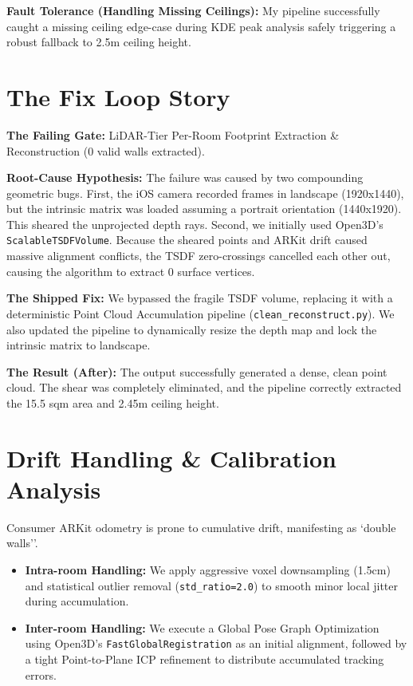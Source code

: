 \documentclass[11pt,a4paper]{article}
\begin{document}
\textbf{Fault Tolerance (Handling Missing Ceilings):} My pipeline successfully caught a missing ceiling edge-case during KDE peak analysis safely triggering a robust fallback to 2.5m ceiling height.

\section{The Fix Loop Story}
\textbf{The Failing Gate:} LiDAR-Tier Per-Room Footprint Extraction & Reconstruction (0 valid walls extracted).

\textbf{Root-Cause Hypothesis:} The failure was caused by two compounding geometric bugs. First, the iOS camera recorded frames in landscape (1920x1440), but the intrinsic matrix was loaded assuming a portrait orientation (1440x1920). This sheared the unprojected depth rays. Second, we initially used Open3D's \texttt{ScalableTSDFVolume}. Because the sheared points and ARKit drift caused massive alignment conflicts, the TSDF zero-crossings cancelled each other out, causing the algorithm to extract 0 surface vertices.

\textbf{The Shipped Fix:} We bypassed the fragile TSDF volume, replacing it with a deterministic Point Cloud Accumulation pipeline (\texttt{clean\_reconstruct.py}). We also updated the pipeline to dynamically resize the depth map and lock the intrinsic matrix to landscape.

\textbf{The Result (After):} The output successfully generated a dense, clean point cloud. The shear was completely eliminated, and the pipeline correctly extracted the 15.5 sqm area and 2.45m ceiling height.

\section{Drift Handling \& Calibration Analysis}
Consumer ARKit odometry is prone to cumulative drift, manifesting as `double walls''.
\begin{itemize}
    \item \textbf{Intra-room Handling:} We apply aggressive voxel downsampling (1.5cm) and statistical outlier removal (\texttt{std\_ratio=2.0}) to smooth minor local jitter during accumulation.
    \item \textbf{Inter-room Handling:} We execute a Global Pose Graph Optimization using Open3D's \texttt{FastGlobalRegistration} as an initial alignment, followed by a tight Point-to-Plane ICP refinement to distribute accumulated tracking errors.
\end{itemize}
\end{document}

